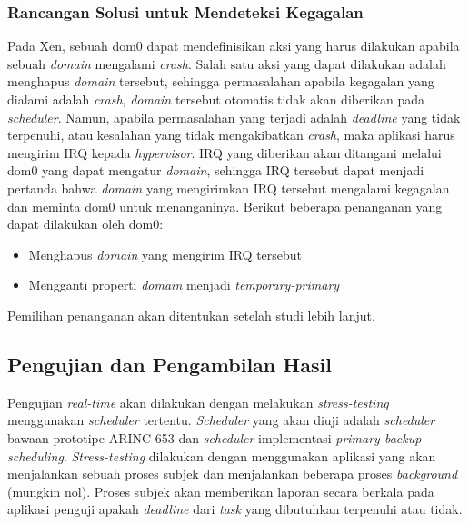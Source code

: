 \subsubsection{Rancangan Solusi untuk Mendeteksi Kegagalan}

Pada Xen, sebuah dom0 dapat mendefinisikan aksi yang harus dilakukan apabila sebuah \textit{domain} mengalami \textit{crash}.
Salah satu aksi yang dapat dilakukan adalah menghapus \textit{domain} tersebut, sehingga permasalahan apabila kegagalan yang dialami adalah \textit{crash}, \textit{domain} tersebut otomatis tidak akan diberikan pada \textit{scheduler}.
Namun, apabila permasalahan yang terjadi adalah \textit{deadline} yang tidak terpenuhi, atau kesalahan yang tidak mengakibatkan \textit{crash}, maka aplikasi harus mengirim IRQ kepada \textit{hypervisor}.
IRQ yang diberikan akan ditangani melalui dom0 yang dapat mengatur \textit{domain}, sehingga IRQ tersebut dapat menjadi pertanda bahwa \textit{domain} yang mengirimkan IRQ tersebut mengalami kegagalan dan meminta dom0 untuk menanganinya.
Berikut beberapa penanganan yang dapat dilakukan oleh dom0:
\begin{itemize}
    \item Menghapus \textit{domain} yang mengirim IRQ tersebut
    \item Mengganti properti \textit{domain} menjadi \textit{temporary-primary}
\end{itemize}
Pemilihan penanganan akan ditentukan setelah studi lebih lanjut.

\subsection{Pengujian dan Pengambilan Hasil}

Pengujian \textit{real-time} akan dilakukan dengan melakukan \textit{stress-testing} menggunakan \textit{scheduler} tertentu.
\textit{Scheduler} yang akan diuji adalah \textit{scheduler} bawaan prototipe ARINC 653 dan \textit{scheduler} implementasi \textit{primary-backup scheduling}.
\textit{Stress-testing} dilakukan dengan menggunakan aplikasi yang akan menjalankan sebuah proses subjek dan menjalankan beberapa proses \textit{background} (mungkin nol).
Proses subjek akan memberikan laporan secara berkala pada aplikasi penguji apakah \textit{deadline} dari \textit{task} yang dibutuhkan terpenuhi atau tidak.


